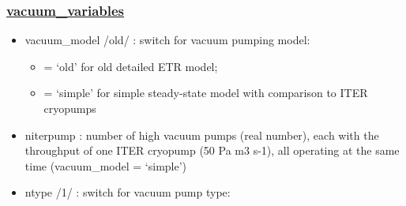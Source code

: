 \documentclass[]{article}
\providecommand{\tightlist}{%
  \setlength{\itemsep}{0pt}\setlength{\parskip}{0pt}}
\begin{document}
\subsubsection{\texorpdfstring{\href{vacuum_variables.html}{vacuum\_variables}}{vacuum\_variables}}\label{vacuum_variables}

\begin{itemize}
\item
  vacuum\_model /old/ : switch for vacuum pumping model:

  \begin{itemize}
  \tightlist
  \item
    = `old' for old detailed ETR model;
  \item
    = `simple' for simple steady-state model with comparison to ITER
    cryopumps
  \end{itemize}
\item
  niterpump : number of high vacuum pumps (real number), each with the
  throughput of one ITER cryopump (50 Pa m3 s-1), all operating at the
  same time (vacuum\_model = `simple')
\item
  ntype /1/ : switch for vacuum pump type:


\end{itemize}
\end{document}
